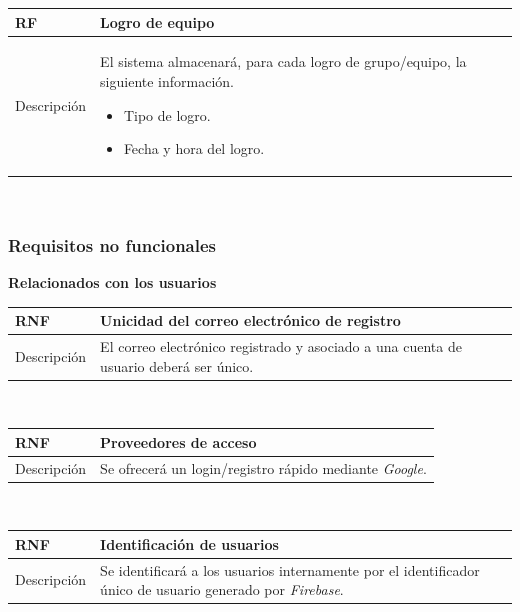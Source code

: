\documentclass[twoside]{report}
\newcommand\addrow[2]{#1 &#2\\ }
\newcommand\addheading[2]{#1 &#2\\ \hline}
\newcommand\tabularhead{\begin{tabular}{lp{0.7\textwidth}}
\hline
}
\newenvironment{req}{\tabularhead}
{\hline\end{tabular}}
\begin{document}
\vspace{0.25cm}

\begin{req}
	\addheading{\textbf{RF\arabic{functionalRequirements}}}{Logro de equipo}
	\addrow{Descripción}{
	El sistema almacenará, para cada logro de grupo/equipo, la siguiente información.
	\begin{multicols}{2}
	\begin{itemize}
		\item Tipo de logro.
		\item Fecha y hora del logro.
	\end{itemize}
	\end{multicols}
	}
\end{req}\\

\vspace{1cm}

\subsubsection{Requisitos no funcionales}

\textbf{Relacionados con los usuarios}\\

\begin{req}
	\addheading{\textbf{RNF\arabic{nonFunctionalRequirements}}}{Unicidad del correo electrónico de registro}
	\addrow{Descripción}{El correo electrónico registrado y asociado a una cuenta de usuario deberá ser único.}
\end{req}\\

\vspace{0.25cm}

\begin{req}
	\addheading{\textbf{RNF\arabic{nonFunctionalRequirements}}}{Proveedores de acceso}
	\addrow{Descripción}{Se ofrecerá un login/registro rápido mediante \textit{Google}.}
\end{req}\\

\vspace{0.25cm}

\begin{req}
	\addheading{\textbf{RNF\arabic{nonFunctionalRequirements}}}{Identificación de usuarios}
	\addrow{Descripción}{Se identificará a los usuarios internamente por el identificador único de usuario generado por \textit{Firebase}.}
\end{req}\\
\end{document}
